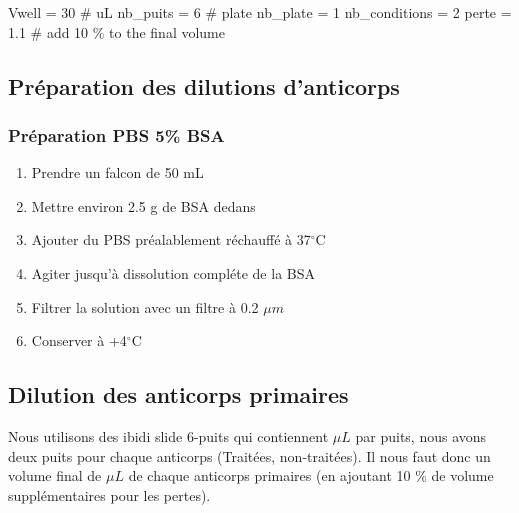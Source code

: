 \begin{pycode}
Vwell = 30 # uL
nb_puits = 6 # plate
nb_plate = 1
nb_conditions = 2
perte = 1.1 # add 10 \% to the final volume

\end{pycode}

\subsection{Préparation des dilutions d'anticorps}

\subsubsection{Préparation PBS 5\% BSA}

\begin{enumerate}
\item Prendre un falcon de 50 mL
\item Mettre environ 2.5 g de BSA dedans
\item Ajouter du PBS préalablement réchauffé à 37$^\circ$C
\item Agiter jusqu'à dissolution compléte de la BSA
\item Filtrer la solution avec un filtre à 0.2 $\mu m$
\item Conserver à +4$^\circ$C
\end{enumerate}

\subsection{Dilution des anticorps primaires}
\label{dilution-abs-primaire}

Nous utilisons des ibidi slide 6-puits qui contiennent  $\mu L$ par puits, nous avons deux puits pour chaque anticorps (Traitées, non-traitées). Il nous faut donc un volume final de  $\mu L$ de chaque anticorps primaires (en ajoutant 10 \% de volume supplémentaires pour les pertes).

